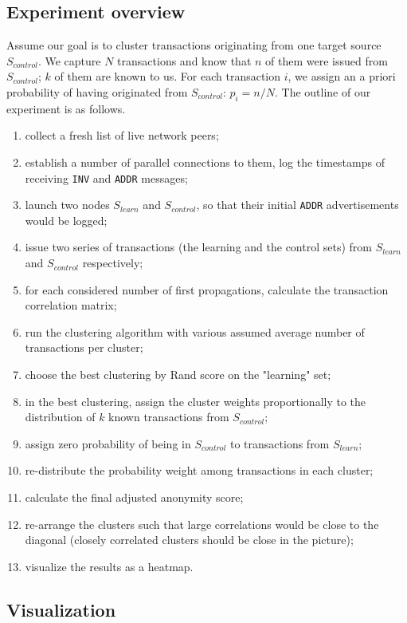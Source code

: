 \subsection{Experiment overview}

Assume our goal is to cluster transactions originating from one target source $S_{control}$.
We capture $N$ transactions and know that $n$ of them were issued from $S_{control}$; $k$ of them are known to us.
For each transaction $i$, we assign an a priori probability of having originated from $S_{control}$: $p_i = n / N$.
The outline of our experiment is as follows.

\begin{enumerate}
	\item collect a fresh list of live network peers;
	\item establish a number of parallel connections to them, log the timestamps of receiving \texttt{INV} and \texttt{ADDR} messages;
	\item launch two nodes $S_{learn}$ and $S_{control}$, so that their initial \texttt{ADDR} advertisements would be logged;
	\item issue two series of transactions (the learning and the control sets) from $S_{learn}$ and $S_{control}$ respectively;
	\item for each considered number of first propagations, calculate the transaction correlation matrix;
	\item run the clustering algorithm with various assumed average number of transactions per cluster;
	\item choose the best clustering by Rand score on the "learning" set;
	\item in the best clustering, assign the cluster weights proportionally to the distribution of $k$ known transactions from $S_{control}$;
	\item assign zero probability of being in $S_{control}$ to transactions from $S_{learn}$;
	\item re-distribute the probability weight among transactions in each cluster;
	\item calculate the final adjusted anonymity score;
	\item re-arrange the clusters such that large correlations would be close to the diagonal (closely correlated clusters should be close in the picture);
	\item visualize the results as a heatmap.
\end{enumerate}

\subsection{Visualization}

